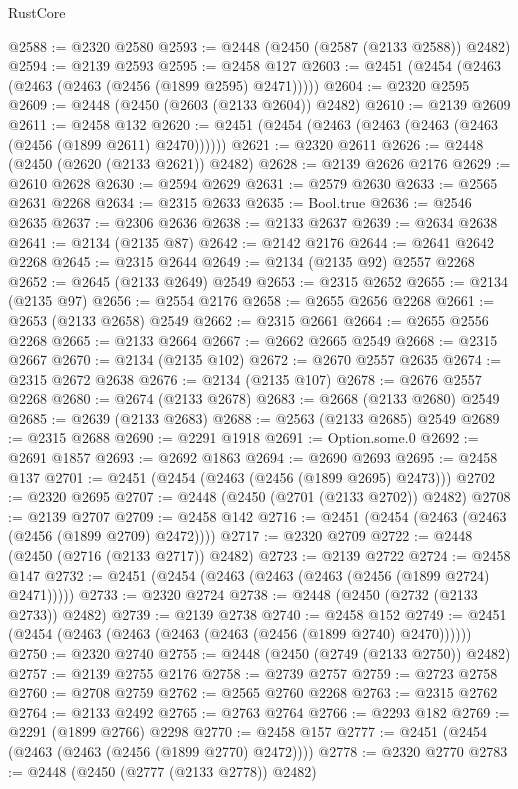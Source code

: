 \begin{lexlean}{RustCore}
\begin{coremodule}
@2588 := @2320 @2580
@2593 := @2448 (@2450 (@2587 (@2133 @2588)) @2482)
@2594 := @2139 @2593
@2595 := @2458 @127
@2603 := @2451 (@2454 (@2463 (@2463 (@2463 (@2456 (@1899 @2595) @2471)))))
@2604 := @2320 @2595
@2609 := @2448 (@2450 (@2603 (@2133 @2604)) @2482)
@2610 := @2139 @2609
@2611 := @2458 @132
@2620 := @2451 (@2454 (@2463 (@2463 (@2463 (@2463 (@2456 (@1899 @2611) @2470))))))
@2621 := @2320 @2611
@2626 := @2448 (@2450 (@2620 (@2133 @2621)) @2482)
@2628 := @2139 @2626 @2176
@2629 := @2610 @2628
@2630 := @2594 @2629
@2631 := @2579 @2630
@2633 := @2565 @2631 @2268
@2634 := @2315 @2633
@2635 := Bool.true
@2636 := @2546 @2635
@2637 := @2306 @2636
@2638 := @2133 @2637
@2639 := @2634 @2638
@2641 := @2134 (@2135 @87)
@2642 := @2142 @2176
@2644 := @2641 @2642 @2268
@2645 := @2315 @2644
@2649 := @2134 (@2135 @92) @2557 @2268
@2652 := @2645 (@2133 @2649) @2549
@2653 := @2315 @2652
@2655 := @2134 (@2135 @97)
@2656 := @2554 @2176
@2658 := @2655 @2656 @2268
@2661 := @2653 (@2133 @2658) @2549
@2662 := @2315 @2661
@2664 := @2655 @2556 @2268
@2665 := @2133 @2664
@2667 := @2662 @2665 @2549
@2668 := @2315 @2667
@2670 := @2134 (@2135 @102)
@2672 := @2670 @2557 @2635
@2674 := @2315 @2672 @2638
@2676 := @2134 (@2135 @107)
@2678 := @2676 @2557 @2268
@2680 := @2674 (@2133 @2678)
@2683 := @2668 (@2133 @2680) @2549
@2685 := @2639 (@2133 @2683)
@2688 := @2563 (@2133 @2685) @2549
@2689 := @2315 @2688
@2690 := @2291 @1918
@2691 := Option.some.{0}
@2692 := @2691 @1857
@2693 := @2692 @1863
@2694 := @2690 @2693
@2695 := @2458 @137
@2701 := @2451 (@2454 (@2463 (@2456 (@1899 @2695) @2473)))
@2702 := @2320 @2695
@2707 := @2448 (@2450 (@2701 (@2133 @2702)) @2482)
@2708 := @2139 @2707
@2709 := @2458 @142
@2716 := @2451 (@2454 (@2463 (@2463 (@2456 (@1899 @2709) @2472))))
@2717 := @2320 @2709
@2722 := @2448 (@2450 (@2716 (@2133 @2717)) @2482)
@2723 := @2139 @2722
@2724 := @2458 @147
@2732 := @2451 (@2454 (@2463 (@2463 (@2463 (@2456 (@1899 @2724) @2471)))))
@2733 := @2320 @2724
@2738 := @2448 (@2450 (@2732 (@2133 @2733)) @2482)
@2739 := @2139 @2738
@2740 := @2458 @152
@2749 := @2451 (@2454 (@2463 (@2463 (@2463 (@2463 (@2456 (@1899 @2740) @2470))))))
@2750 := @2320 @2740
@2755 := @2448 (@2450 (@2749 (@2133 @2750)) @2482)
@2757 := @2139 @2755 @2176
@2758 := @2739 @2757
@2759 := @2723 @2758
@2760 := @2708 @2759
@2762 := @2565 @2760 @2268
@2763 := @2315 @2762
@2764 := @2133 @2492
@2765 := @2763 @2764
@2766 := @2293 @182
@2769 := @2291 (@1899 @2766) @2298
@2770 := @2458 @157
@2777 := @2451 (@2454 (@2463 (@2463 (@2456 (@1899 @2770) @2472))))
@2778 := @2320 @2770
@2783 := @2448 (@2450 (@2777 (@2133 @2778)) @2482)

\end{coremodule}
\end{lexlean}
